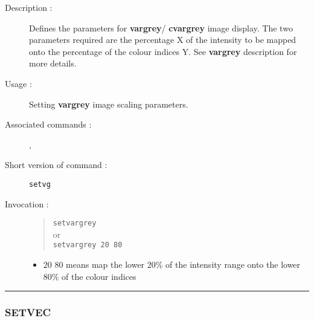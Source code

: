 \begin{description}

\item[Description :] Defines the parameters for {\bf vargrey}/{\bf
cvargrey} image display.  The two parameters required are the
percentage X of the intensity to be mapped onto the percentage of the
colour indices Y.  See {\bf vargrey} description for more details.

\item[Usage :] Setting {\bf vargrey} image scaling parameters.

\item[Associated commands :] {\tt {}},
{\tt {}}

\item[Short version of command :] {\tt setvg}
\item[Invocation :]

\begin{quote}{\tt  setvargrey }\\
or \\
{\tt setvargrey 20 80 }
\end{quote}

\begin{itemize}

\item 20 80 means map the lower 20\% of the intensity range onto
 the lower 80\% of the colour indices

\end{itemize}

\end{description}

\hrule
\subsubsection*{\label{SETVEC}SETVEC}

